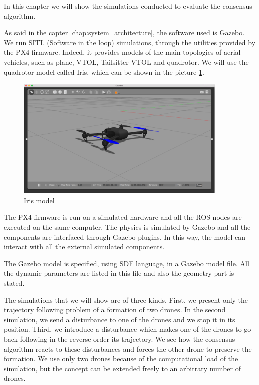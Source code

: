 In this chapter we will show the simulations conducted to evaluate the consensus algorithm.

As said in the capter \ref{chap:system_architecture}, the software used is Gazebo.
We run SITL (Software in the loop) simulations, through the utilities provided by
the PX4 firmware. Indeed, it provides models of the main topologies of aerial vehicles,
such as plane, VTOL, Tailsitter VTOL and quadrotor.
We will use the quadrotor model called Iris, which can be shown in the picture \ref{fig:iris_model}.

\begin{figure}
\centering
\includegraphics[width=0.9\textwidth]{chapters/chapter-04/figures/iris_model.png}
\caption{Iris model}
\label{fig:iris_model}
\end{figure}

The PX4 firmware is run on a simulated hardware and all the ROS nodes are executed
on the same computer. The physics is simulated by Gazebo and all the components
are interfaced through Gazebo plugins. In this way, the model can interact with
all the external simulated components.

The Gazebo model is specified, using SDF language, in a Gazebo model file.
All the dynamic parameters are listed in this file and also the geometry part
is stated.

The simulations that we will show are of three kinds. First, we present only
the trajectory following problem of a formation of two drones.
In the second simulation, we send a disturbance to one of the drones and we stop it
in its position. Third, we introduce a disturbance which makes one of the drones to
go back following in the reverse order its trajectory.
We see how the consensus algorithm reacts to these disturbances and forces the other
drone to preserve the formation.
We use only two drones because of the computational load of the simulation, but the
concept can be extended freely to an arbitrary number of drones.

